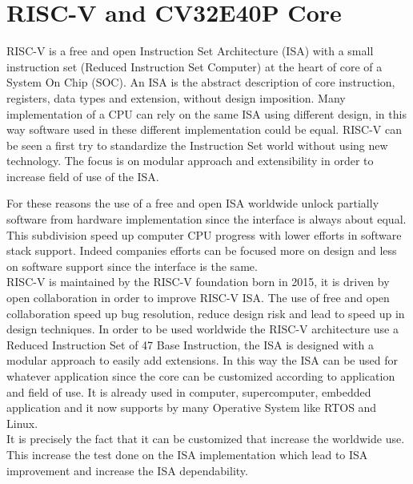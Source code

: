 \chapter{RISC-V and CV32E40P Core}{
	RISC-V is a free and open Instruction Set Architecture (ISA) with a small instruction set (Reduced Instruction Set Computer) at the heart of core of a System On Chip (SOC).
	An ISA is the abstract description of core instruction, registers, data types and extension, without design imposition. 
	Many implementation of a CPU can rely on the same ISA  using different design, in this way software used in these different implementation could be equal.
	RISC-V can be seen a first try to standardize the Instruction Set world without using new technology.
	The focus is on modular approach and extensibility in order to increase field of use of the ISA.
    
    For these reasons the use of a free and open ISA worldwide unlock partially software from hardware implementation since the interface is always about equal.
    This subdivision speed up computer CPU progress with lower efforts in software stack support.
    Indeed companies efforts can be focused more on design and less on software support since the interface is the same.\\
    
    RISC-V is maintained by the RISC-V foundation born in 2015, it is driven by open collaboration in order to improve RISC-V ISA.
    The use of free and open collaboration speed up bug resolution, reduce design risk and lead to speed up in design techniques.
    In order to be used worldwide the RISC-V architecture use a Reduced Instruction Set  of 47 Base Instruction, the ISA is designed with a modular approach to easily add extensions. 
    In this way the ISA can be used for whatever application since the core can be customized according to application and field of use.
    It is already used in computer, supercomputer, embedded application and it now supports by many Operative System like RTOS and Linux.\\
    
    It is precisely the fact that it can be customized that increase the worldwide use.
    This increase the test done on the ISA implementation which lead to ISA improvement and increase the ISA dependability.
    
}
